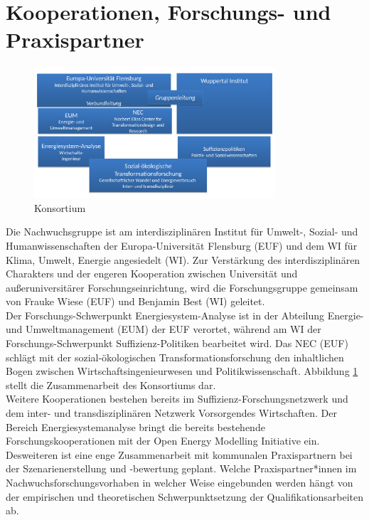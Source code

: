 \documentclass[a4paper,11pt,twoside]{scrartcl}
\begin{document}
\section{Kooperationen, Forschungs- und Praxispartner}
\label{sec:5}

\begin{figure}[!h]
    \centering
    \includegraphics[width=0.8\textwidth]{figures/Konsortium5.pdf}
    \caption{Konsortium}
    \label{fig:konsortium}
\end{figure}

Die Nachwuchsgruppe ist am interdisziplinären Institut für Umwelt-, Sozial- und Humanwissenschaften der Europa-Universität Flensburg (EUF) und dem WI für Klima, Umwelt, Energie angesiedelt (WI).
Zur Verstärkung des interdisziplinären Charakters und der engeren Kooperation zwischen Universität und außeruniversitärer Forschungseinrichtung, wird die Forschungsgruppe gemeinsam von Frauke Wiese (EUF) und Benjamin Best (WI) geleitet.\\
Der Forschungs-Schwerpunkt Energiesystem-Analyse ist in der Abteilung Energie- und Umweltmanagement (EUM) der EUF verortet, während am WI der Forschungs-Schwerpunkt Suffizienz-Politiken bearbeitet wird. Das NEC (EUF) schlägt mit der sozial-ökologischen Transformationsforschung den inhaltlichen Bogen zwischen Wirtschaftsingenieurwesen und Politikwissenschaft. Abbildung \ref{fig:konsortium} stellt die Zusammenarbeit des Konsortiums dar.\\
Weitere Kooperationen bestehen bereits im Suffizienz-Forschungsnetzwerk und dem inter- und transdisziplinären Netzwerk Vorsorgendes Wirtschaften. Der Bereich Energiesystemanalyse bringt die bereits bestehende Forschungskooperationen mit der Open Energy Modelling Initiative \cite{openmod} ein.\\
Desweiteren ist eine enge Zusammenarbeit mit kommunalen Praxispartnern bei der Szenarienerstellung und -bewertung geplant. Welche Praxispartner*innen im Nachwuchsforschungsvorhaben in welcher Weise eingebunden werden hängt von der empirischen und theoretischen Schwerpunktsetzung der Qualifikationsarbeiten ab.
\end{document}
